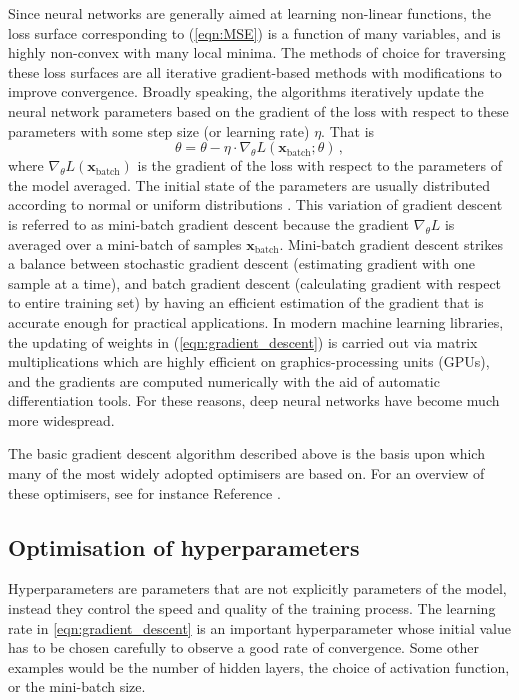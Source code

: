 \documentclass[main.tex]{subfiles}
\begin{document}
    Since neural networks are generally aimed at
    learning non-linear functions, the loss surface
    corresponding to (\ref{eqn:MSE}) is
    a function of many variables, and is highly
    non-convex with many local minima.
    The methods of choice for traversing these loss surfaces
    are all iterative gradient-based methods with modifications
    to improve convergence. Broadly speaking, the algorithms
    iteratively update the neural network parameters based on the
    gradient of the loss with respect to these parameters
    with some step size (or learning rate) $\eta$. That is
    \begin{equation}\label{eqn:gradient_descent}
        \theta = \theta - \eta \cdot \nabla_{\theta} L(\mathbf{x}_{\mathrm{batch}}; \theta) \, ,
    \end{equation}
    where $\nabla_{\theta}L(\mathbf{x}_{\mathrm{batch}})$ is the
    gradient of the loss with respect to the parameters of the
    model averaged. The initial state of the parameters
    are usually distributed according to normal
    or uniform distributions \cite{pmlr-v9-glorot10a,he_initialiser}.
    This variation of gradient descent is referred to
    as mini-batch gradient descent because the gradient
    $\nabla_{\theta}L$ is averaged over a mini-batch of
    samples $\mathbf{x}_{\mathrm{batch}}$. Mini-batch gradient
    descent strikes a balance between stochastic gradient
    descent (estimating gradient with one sample at a time),
    and batch gradient descent (calculating gradient with
    respect to entire training set) by having an efficient
    estimation of the gradient that is accurate enough
    for practical applications. In modern machine learning
    libraries, the updating of weights in (\ref{eqn:gradient_descent})
    is carried out via matrix multiplications which are
    highly efficient on graphics-processing units (GPUs),
    and the gradients are computed numerically with the aid
    of automatic differentiation tools. For these reasons, deep
    neural networks have become much more widespread.

    The basic gradient descent algorithm described above
    is the basis upon which many of the most widely
    adopted optimisers \cite{kiefer1952stochastic,hintonrmsprop,Kingma:2014vow}
    are based on. For an overview of these optimisers, see for instance
    Reference \cite{Ruder:2016lil}.

    \subsection{Optimisation of hyperparameters}
    Hyperparameters are parameters that are
    not explicitly parameters of the model, instead they control
    the speed and quality of the training process.
    The learning rate in {\ref{eqn:gradient_descent}} is
    an important hyperparameter whose initial value has
    to be chosen carefully to observe a good rate of convergence.
    Some other examples would be
    the number of hidden layers, the choice of activation
    function, or the mini-batch size.
\end{document}
